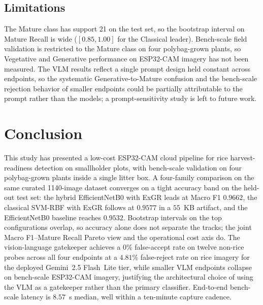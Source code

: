 \documentclass[conference]{IEEEtran}
\begin{document}
\subsection{Limitations}
The Mature class has support 21 on the test set, so the bootstrap interval on Mature Recall is wide ($[0.85, 1.00]$ for the Classical leader). Bench-scale field validation is restricted to the Mature class on four polybag-grown plants, so Vegetative and Generative performance on ESP32-CAM imagery has not been measured. The VLM results reflect a single prompt design held constant across endpoints, so the systematic Generative-to-Mature confusion and the bench-scale rejection behavior of smaller endpoints could be partially attributable to the prompt rather than the models; a prompt-sensitivity study is left to future work.

\section{Conclusion}
This study has presented a low-cost ESP32-CAM cloud pipeline for rice harvest-readiness detection on smallholder plots, with bench-scale validation on four polybag-grown plants inside a single litter box. A four-family comparison on the same curated 1140-image dataset converges on a tight accuracy band on the held-out test set: the hybrid EfficientNetB0 with ExGR leads at Macro F1 $0.9662$, the classical SVM-RBF with ExGR follows at $0.9577$ in a $55$~KB artifact, and the EfficientNetB0 baseline reaches $0.9532$. Bootstrap intervals on the top configurations overlap, so accuracy alone does not separate the tracks; the joint Macro F1--Mature Recall Pareto view and the operational cost axis do. The vision-language gatekeeper achieves a $0\%$ false-accept rate on twelve non-rice probes across all four endpoints at a $4.81\%$ false-reject rate on rice imagery for the deployed Gemini~2.5 Flash~Lite tier, while smaller VLM endpoints collapse on bench-scale ESP32-CAM imagery, justifying the architectural choice of using the VLM as a gatekeeper rather than the primary classifier. End-to-end bench-scale latency is $8.57$~s median, well within a ten-minute capture cadence.
\end{document}
